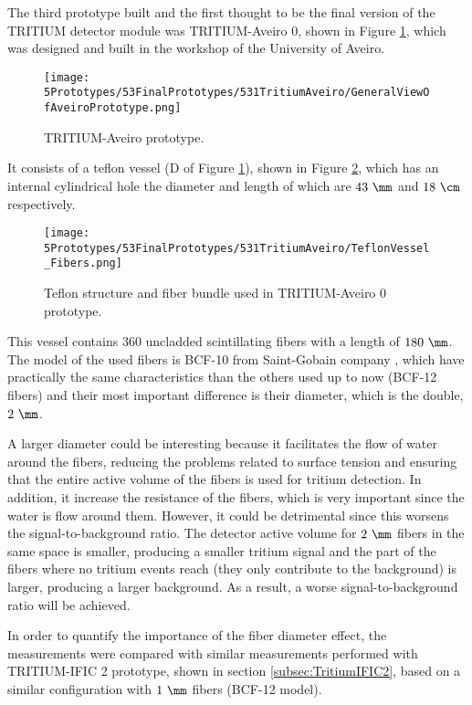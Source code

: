 The third prototype built and the first thought to be the final version of the TRITIUM detector module was TRITIUM-Aveiro 0, shown in Figure \ref{fig:TritiumAveiro0}, which was designed and built in the workshop of the University of Aveiro. 

\begin{figure}[h]
\centering
\texttt{[image: 5Prototypes/53FinalPrototypes/531TritiumAveiro/GeneralViewOfAveiroPrototype.png]}
\caption{TRITIUM-Aveiro prototype.\label{fig:TritiumAveiro0}}
\end{figure}


It consists of a teflon vessel (D of Figure \ref{fig:TritiumAveiro0}), shown in Figure \ref{fig:TeflonStructureFibersTritiumAveiro0}, which has an internal cylindrical hole the diameter and length of which are $43~\mm$ and $18~\cm$ respectively. 

\begin{figure}[h]
\centering
\texttt{[image: 5Prototypes/53FinalPrototypes/531TritiumAveiro/TeflonVessel\_Fibers.png]}
\caption{Teflon structure and fiber bundle used in TRITIUM-Aveiro 0 prototype.\label{fig:TeflonStructureFibersTritiumAveiro0}}
\end{figure}

This vessel contains $360$ uncladded scintillating fibers with a length of $180~\mm$. The model of the used fibers is BCF-10 from Saint-Gobain company \cite{DataSheetBCF10Fiber}, which have practically the same characteristics than the others used up to now (BCF-12 fibers) and their most important difference is their diameter, which is the double, $2~\mm$.

A larger diameter could be interesting because it facilitates the flow of water around the fibers, reducing the problems related to surface tension and ensuring that the entire active volume of the fibers is used for tritium detection. In addition, it increase the resistance of the fibers, which is very important since the water is flow around them. However, it could be detrimental since this worsens the signal-to-background ratio. The detector active volume for $2~\mm$ fibers in the same space is smaller, producing a smaller tritium signal and the part of the fibers where no tritium events reach (they only contribute to the background) is larger, producing a larger background. As a result, a worse signal-to-background ratio will be achieved.

In order to quantify the importance of the fiber diameter effect, the measurements were compared with similar measurements performed with TRITIUM-IFIC 2 prototype, shown in section \ref{subsec:TritiumIFIC2}, based on a similar configuration with $1~\mm$ fibers (BCF-12 model).

